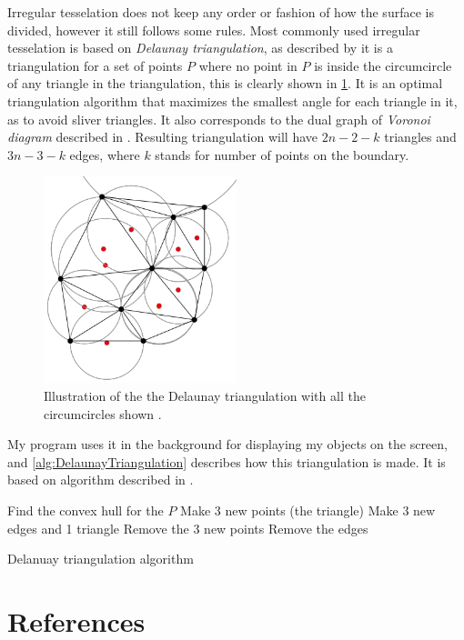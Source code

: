 \documentclass[a4paper,12pt]{extarticle}
\begin{document}
Irregular tesselation does not keep any order or fashion of how the surface is divided, however it still follows some rules. Most commonly used irregular tesselation is based on \emph{Delaunay triangulation}, as described by \citep[Chap 9.2]{Schwarzkopf1997} it is a triangulation for a set of points $P$ where no point in $P$ is inside the circumcircle of any triangle in the triangulation, this is clearly shown in \cref{fig:Circumcircle}. It is an optimal triangulation algorithm that maximizes the smallest angle for each triangle in it, as to avoid sliver triangles. It also corresponds to the dual graph of \emph{Voronoi diagram} described in \citep[Chap 7.1]{Schwarzkopf1997}. Resulting triangulation will have $2n-2-k$ triangles and $3n-3-k$ edges, where $k$ stands for number of points on the boundary.

\begin{figure}[H]
  \centering
  \includegraphics[width=0.5\textwidth]{Circumcircle.png}
  \caption{Illustration of the the Delaunay triangulation with all the circumcircles shown \citep{NuEs:2016}.}
  \label{fig:Circumcircle}
\end{figure}

My program uses it in the background for displaying my objects on the screen, and \cref{alg:DelaunayTriangulation} describes how this triangulation is made. It is based on algorithm described in \citep[Chap 9.3]{Schwarzkopf1997}.

\begin{algorithm}
  \SetAlgoLined
  Find the convex hull for the $P$\;
  Make 3 new points (the triangle)\;
  Make 3 new edges and 1 triangle\;
  Remove the 3 new points\;
  Remove the edges\;
  \caption{Delanuay triangulation algorithm}
  \label{alg:DelaunayTriangulation}
\end{algorithm}
 
\section{References}
\begingroup
\def\section*#1{}


\endgroup
\end{document}
